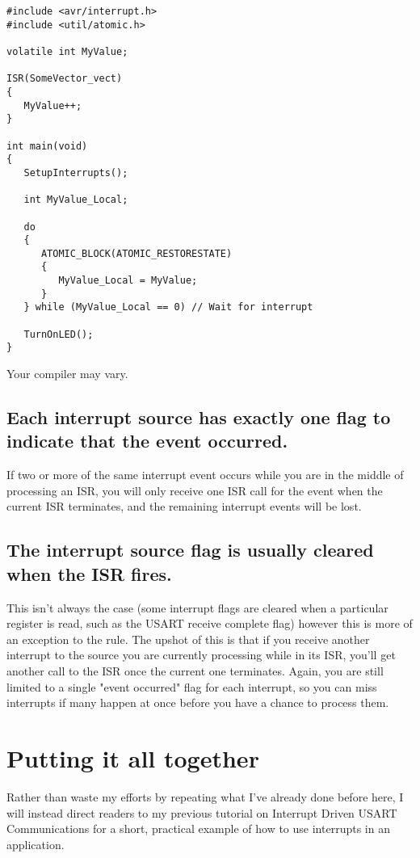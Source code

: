 \documentclass[a4paper,oneside,notitlepage]{book}
\begin{document}
\begin{center}
\begin{lstlisting}
#include <avr/interrupt.h>
#include <util/atomic.h>

volatile int MyValue;

ISR(SomeVector_vect)
{
   MyValue++;
}

int main(void)
{
   SetupInterrupts();

   int MyValue_Local;

   do
   {
      ATOMIC_BLOCK(ATOMIC_RESTORESTATE)
      {
         MyValue_Local = MyValue;
      }
   } while (MyValue_Local == 0) // Wait for interrupt

   TurnOnLED();
}
\end{lstlisting}
\end{center}

Your compiler may vary.

\section{Each interrupt source has exactly one flag to indicate that the event occurred.}
If two or more of the same interrupt event occurs while you are in the middle of processing an ISR, you will only receive one ISR call for the event when the current ISR terminates, and the remaining interrupt events will be lost.

\section{The interrupt source flag is usually cleared when the ISR fires.}
This isn't always the case (some interrupt flags are cleared when a particular register is read, such as the USART receive complete flag) however this is more of an exception to the rule. The upshot of this is that if you receive another interrupt to the source you are currently processing while in its ISR, you'll get another call to the ISR once the current one terminates. Again, you are still limited to a single "event occurred" flag for each interrupt, so you can miss interrupts if many happen at once before you have a chance to process them.


\label{chp:FinalWords}
\chapter{Putting it all together}

Rather than waste my efforts by repeating what I've already done before here, I will instead direct readers to my previous tutorial on Interrupt Driven USART Communications for a short, practical example of how to use interrupts in an application. 
\end{document}
